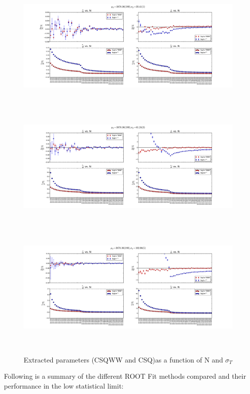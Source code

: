 \documentclass[12pt]{article}
\begin{document}
\begin{figure}[ht]
	\includegraphics[height=2.5in,width=5.5in]{fit-comp_MU-190_SG-1_fit-opt-WW_binw-025.pdf}
	\includegraphics[height=2.5in,width=5.5in]{fit-comp_MU-190_SG-3_fit-opt-WW_binw-025.pdf}
	\includegraphics[height=2.5in,width=5.5in]{fit-comp_MU-190_SG-5_fit-opt-WW_binw-025.pdf}
	\caption{Extracted parameters (CSQWW and CSQ)as a function of N and $\sigma_{T}$}
	\label{fig3}
\end{figure}

\clearpage

Following is a summary of the different ROOT Fit methods compared and their performance in the low statistical limit:
\end{document}
